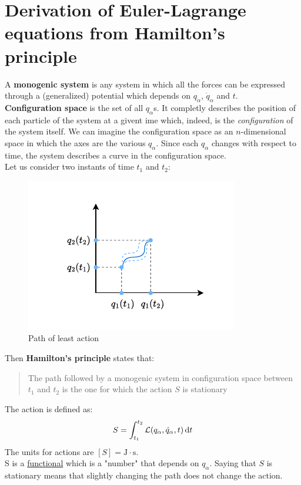 \section{Derivation of Euler-Lagrange equations from Hamilton's principle}
A \textbf{monogenic system} is any system in which all the forces can be expressed through a (generalized) potential which depends on $q_{\alpha}$, $\dot{q}_{\alpha}$ and $t$.\\
\textbf{Configuration space} is the set of all $q_{\alpha}$s. It completly describes the position of each particle of the system at a givent ime which, indeed, is the \textit{configuration} of the system itself. We can imagine the configuration space as an $n$-dimensional space in which the axes are the various $q_{\alpha}$.
Since each $q_{\alpha}$ changes with respect to time, the system describes a curve in the configuration space.\\
Let us consider two instants of time $t_1$ and $t_2$:
\begin{figure}[H]
    \centering
    \includegraphics[width=0.6\linewidth]{res/svg/leastactionpath.drawio}
    \caption{Path of least action}
    \label{fig:image9}
\end{figure}
Then \textbf{Hamilton's principle} states that:
\begin{quote} \label{q:Hamilton_principle_quote}
    The path followed by a monogenic system in configuration space between $t_1$ and $t_2$ is the one for which the action $S$ is stationary
\end{quote}
The action is defined as:
\begin{equation}
    S = \int_{t_1}^{t_2}\mathcal{L}(q_{\alpha},\dot{q}_{\alpha},t) \dd{t}
\end{equation}
The units for actions are $[S] = \mathrm{J\cdot s}$.\\S is a \underline{functional} which is a "number" that depends on $q_{\alpha}$. Saying that $S$ is stationary means that slightly changing the path does not change the action.\\
